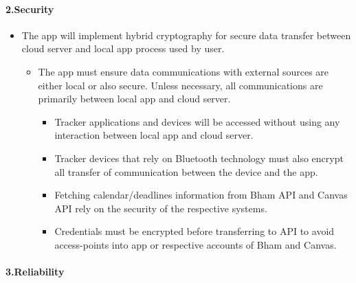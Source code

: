 \documentclass[a4paper,11pt]{article} %
\begin{document}
\hypertarget{security}{%
\paragraph{2.Security}\label{security}}

\begin{itemize}
\item
  The app will implement hybrid cryptography for secure data transfer
  between cloud server and local app process used by user.

  \begin{itemize}
  \item
    The app must ensure data communications with external sources are
    either local or also secure. Unless necessary, all communications
    are primarily between local app and cloud server.

    \begin{itemize}
    \item
      Tracker applications and devices will be accessed without using
      any interaction between local app and cloud server.
    \item
      Tracker devices that rely on Bluetooth technology must also
      encrypt all transfer of communication between the device and the
      app.
    \item
      Fetching calendar/deadlines information from Bham API and Canvas
      API rely on the security of the respective systems.
    \item
      Credentials must be encrypted before transferring to API to avoid
      access-points into app or respective accounts of Bham and Canvas.
    \end{itemize}
  \end{itemize}
\end{itemize}

\hypertarget{reliability}{%
\paragraph{3.Reliability}\label{reliability}}
\end{document}
